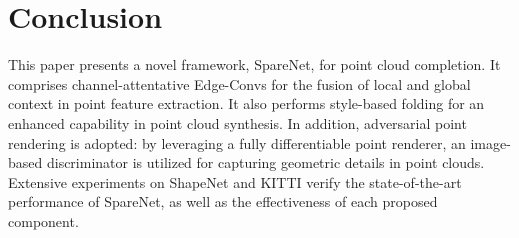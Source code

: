 \documentclass[final]{cvpr}
\begin{document}
\section{Conclusion}
This paper presents a novel framework, SpareNet, for point cloud completion. 
It comprises channel-attentative Edge-Convs for the fusion of local and global context in point feature extraction. 
It also performs style-based folding for an enhanced capability in point cloud synthesis.
In addition, adversarial point rendering is adopted: by leveraging a fully differentiable point renderer, an image-based discriminator is utilized for capturing geometric details in point clouds.
Extensive experiments on ShapeNet and KITTI verify the state-of-the-art performance of SpareNet, as well as the effectiveness of each proposed component.
\end{document}
